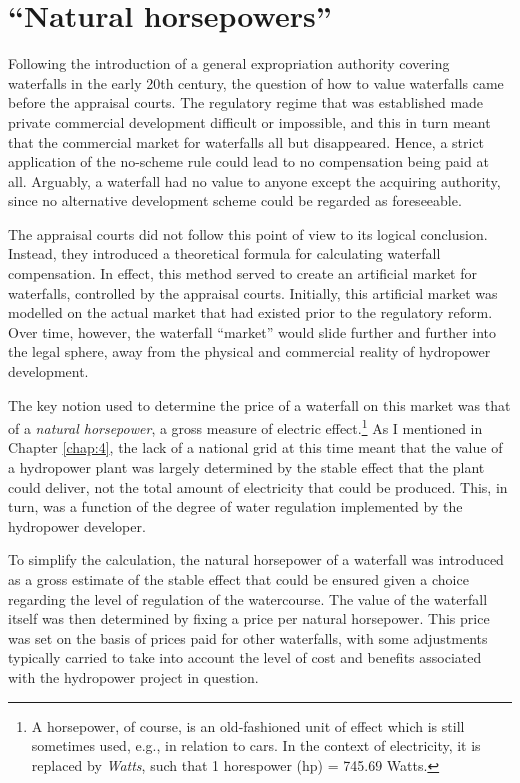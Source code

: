 \section{``Natural horsepowers''}

Following the introduction of a general expropriation authority covering waterfalls in the early 20th century, the question of how to value waterfalls came before the appraisal courts. The regulatory regime that was established made private commercial development difficult or impossible, and this in turn meant that the commercial market for waterfalls all but disappeared. Hence, a strict application of the no-scheme rule could lead to no compensation being paid at all. Arguably, a waterfall had no value to anyone except the acquiring authority, since no alternative development scheme could be regarded as foreseeable.

The appraisal courts did not follow this point of view to its logical conclusion. Instead, they introduced a theoretical formula for calculating waterfall compensation. In effect, this method served to create an artificial market for waterfalls, controlled by the appraisal courts. Initially, this artificial market was modelled on the actual market that had existed prior to the regulatory reform. Over time, however, the waterfall ``market'' would slide further and further into the legal sphere, away from the physical and commercial reality of hydropower development.

The key notion used to determine the price of a waterfall on this market was that of a {\it natural horsepower}, a gross measure of electric effect.\footnote{A horsepower, of course, is an old-fashioned unit of effect which is still sometimes used, e.g., in relation to cars. In the context of electricity, it is replaced by {\it Watts}, such that 1 horespower (hp) = 745.69 Watts.} As I mentioned in Chapter \ref{chap:4}, the lack of a national grid at this time meant that the value of a hydropower plant was largely determined by the stable effect that the plant could deliver, not the total amount of electricity that could be produced. This, in turn, was a function of the degree of water regulation implemented by the hydropower developer. 

To simplify the calculation, the natural horsepower of a waterfall was introduced as a gross estimate of the stable effect that could be ensured given a choice regarding the level of regulation of the watercourse. The value of the waterfall itself was then determined by fixing a price per natural horsepower. This price was set on the basis of prices paid for other waterfalls, with some adjustments typically carried to take into account the level of cost and benefits associated with the hydropower project in question.

